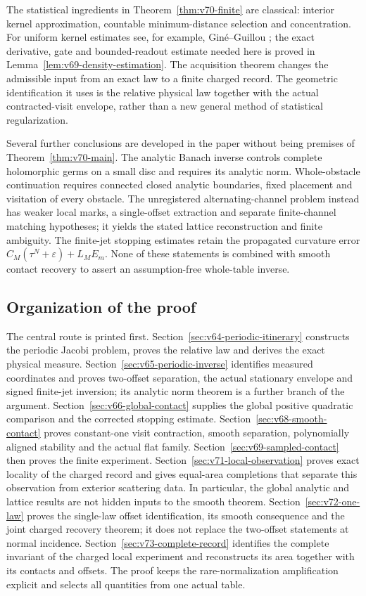 The statistical ingredients in Theorem~\ref{thm:v70-finite} are classical:
interior kernel approximation, countable minimum-distance selection and
concentration.  For uniform kernel estimates see, for example,
Gin\'e--Guillou \cite{GineGuillou2002}; the exact derivative, gate and
bounded-readout estimate needed here is proved in
Lemma~\ref{lem:v69-density-estimation}.  The acquisition theorem changes
the admissible input from an exact law to a finite charged record.  The
geometric identification it uses is the relative physical law together
with the actual contracted-visit envelope, rather than a new general
method of statistical regularization.

Several further conclusions are developed in the paper without being
premises of Theorem~\ref{thm:v70-main}.  The analytic Banach inverse
controls complete holomorphic germs on a small disc and requires its
analytic norm.  Whole-obstacle continuation requires connected closed
analytic boundaries, fixed placement and visitation of every obstacle.
The unregistered alternating-channel problem instead has weaker local
marks, a single-offset extraction and separate finite-channel matching
hypotheses; it yields the stated lattice reconstruction and finite
ambiguity.  The finite-jet stopping estimates retain the propagated
curvature error $C_M(\tau^N+\varepsilon)+L_ME_m$.  None of these
statements is combined with smooth contact recovery to assert an
assumption-free whole-table inverse.

\subsection{Organization of the proof}

The central route is printed first.  Section~\ref{sec:v64-periodic-itinerary}
constructs the periodic Jacobi problem, proves the relative law and derives
the exact physical measure.  Section~\ref{sec:v65-periodic-inverse}
identifies measured coordinates and proves two-offset separation, the
actual stationary envelope and signed finite-jet inversion; its analytic
norm theorem is a further branch of the argument.
Section~\ref{sec:v66-global-contact} supplies the global positive
quadratic comparison and the corrected stopping estimate.
Section~\ref{sec:v68-smooth-contact} proves constant-one visit contraction,
smooth separation, polynomially aligned stability and the actual flat
family.  Section~\ref{sec:v69-sampled-contact} then proves the finite
experiment.  Section~\ref{sec:v71-local-observation} proves exact
locality of the charged record and gives equal-area completions that
separate this observation from exterior scattering data.  In particular,
the global analytic and lattice results are
not hidden inputs to the smooth theorem.  Section~\ref{sec:v72-one-law}
proves the single-law offset identification, its smooth consequence and
the joint charged recovery theorem; it does not replace the two-offset
statements at normal incidence.
Section~\ref{sec:v73-complete-record} identifies the complete invariant
of the charged local experiment and reconstructs its area together with
its contacts and offsets.  The proof keeps the rare-normalization
amplification explicit and selects all quantities from one actual table.

